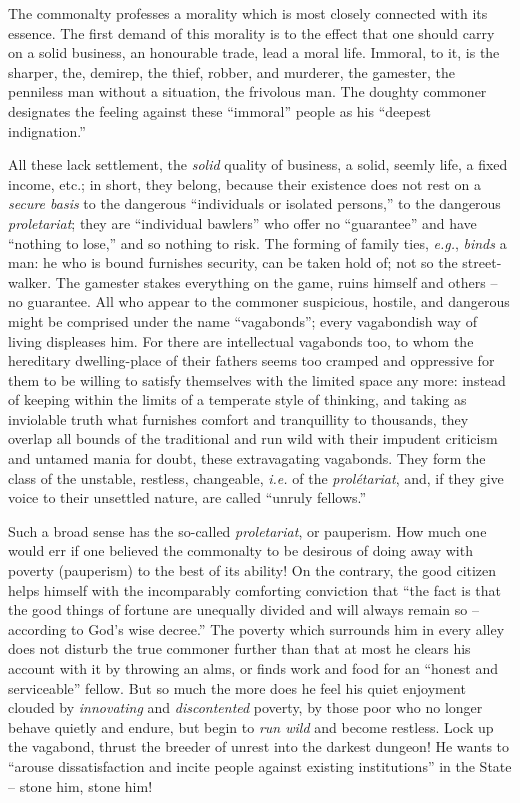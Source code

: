 \documentclass[12pt,a4paper]{book}
\begin{document}
The commonalty professes a morality which is most closely connected with its 
essence. The first demand of this morality is to the effect that one should 
carry on a solid business, an honourable trade, lead a moral life. Immoral, to 
it, is the sharper, the, demirep, the thief, robber, and murderer, the 
gamester, the penniless man without a situation, the frivolous man. The 
doughty commoner designates the feeling against these ``immoral'' people as 
his ``deepest indignation.''

All these lack settlement, the \textit{solid} quality of business, a solid, 
seemly life, a fixed income, etc.; in short, they belong, because their 
existence does not rest on a \textit{secure basis} to the dangerous 
``individuals or isolated persons,'' to the dangerous \textit{proletariat}; 
they are ``individual bawlers'' who offer no ``guarantee'' and have 
``nothing to lose,'' and so nothing to risk. The forming of family ties, 
\textit{e.g.}, \textit{binds} a man: he who is bound furnishes security, can 
be taken hold of; not so the street-walker. The gamester stakes everything on 
the game, ruins himself and others -- no guarantee. All who appear to the 
commoner suspicious, hostile, and dangerous might be comprised under the name 
``vagabonds''; every vagabondish way of living displeases him. For there are 
intellectual vagabonds too, to whom the hereditary dwelling-place of their 
fathers seems too cramped and oppressive for them to be willing to satisfy 
themselves with the limited space any more: instead of keeping within the 
limits of a temperate style of thinking, and taking as inviolable truth what 
furnishes comfort and tranquillity to thousands, they overlap all bounds of 
the traditional and run wild with their impudent criticism and untamed mania 
for doubt, these extravagating vagabonds. They form the class of the unstable, 
restless, changeable, \textit{i.e.} of the \textit{prol\'etariat}, and, if 
they give voice to their unsettled nature, are called ``unruly fellows.''

Such a broad sense has the so-called \textit{proletariat}, or pauperism. How 
much one would err if one believed the commonalty to be desirous of doing away 
with poverty (pauperism) to the best of its ability! On the contrary, the good 
citizen helps himself with the incomparably comforting conviction that ``the 
fact is that the good things of fortune are unequally divided and will always 
remain so -- according to God's wise decree.'' The poverty which surrounds 
him in every alley does not disturb the true commoner further than that at 
most he clears his account with it by throwing an alms, or finds work and food 
for an ``honest and serviceable'' fellow. But so much the more does he feel 
his quiet enjoyment clouded by \textit{innovating} and \textit{discontented} 
poverty, by those poor who no longer behave quietly and endure, but begin to 
\textit{run wild} and become restless. Lock up the vagabond, thrust the 
breeder of unrest into the darkest dungeon! He wants to ``arouse 
dissatisfaction and incite people against existing institutions'' in the 
State -- stone him, stone him!
\end{document}
